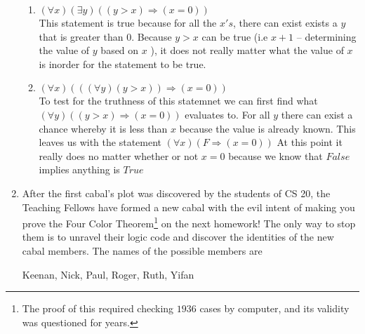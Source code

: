 \documentclass[12pt]{article}
\begin{document}
\begin{enumerate}
\begin{enumerate}
\item $(\forall x)(\exists y) ((y>x) \Rightarrow (x=0))$ \\
This statement is true because for all the $x's$, there can exist exists a $y$ that is greater than $0$. Because $y > x$ can be true (i.e $x + 1$ -- determining the value of $y$ based on $x$ ),  it does not really matter what the value of $x$ is inorder for the statement to be true.
\item $(\forall x)(((\forall y)(y>x)) \Rightarrow (x=0))$ \\
To test for the truthness of this statemnet we can first find what $(\forall y) ((y>x) \Rightarrow ( x = 0))$ evaluates to. For all $y$ there can exist a chance whereby it is less than $x$ because the value is already known. This leaves us with the statement $(\forall x)(F \Rightarrow (x = 0))$ At this point it really does no matter whether or not $x = 0$ because we know that $False$ implies anything is $True$
\end{enumerate}

\item After the first cabal's plot was discovered by the students of CS 20, the Teaching Fellows have formed a new cabal with the evil intent of making you prove the Four Color Theorem\footnote{The proof of this required checking $1936$ cases by computer, and its validity was questioned for years.} on the next homework! The only way to stop them is to unravel their logic code and discover the identities of the new cabal members. The names of the possible members are \\
\begin{center} Keenan, Nick, Paul, Roger, Ruth, Yifan \end{center}


\end{enumerate}
\end{document}
